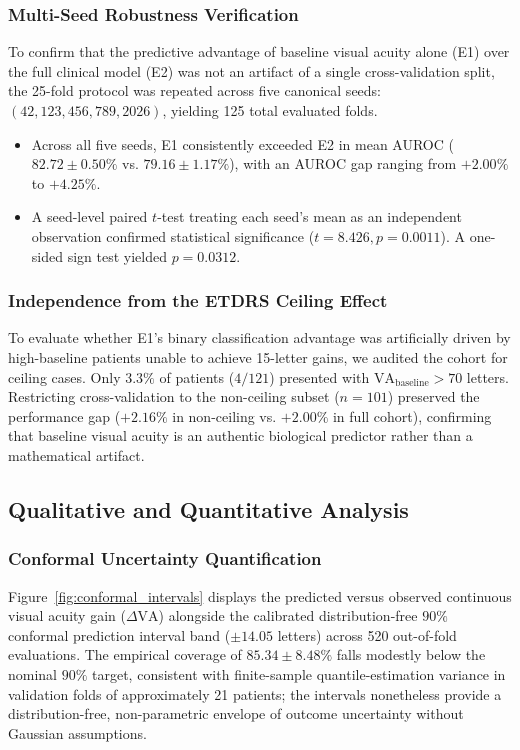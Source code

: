 \documentclass[preprint,12pt]{elsarticle}
\begin{document}
\subsubsection{Multi-Seed Robustness Verification}
To confirm that the predictive advantage of baseline visual acuity alone (E1) over the full clinical model (E2) was not an artifact of a single cross-validation split, the 25-fold protocol was repeated across five canonical seeds: $(42, 123, 456, 789, 2026)$, yielding 125 total evaluated folds. 
\begin{itemize}
    \item Across all five seeds, E1 consistently exceeded E2 in mean AUROC ($82.72 \pm 0.50\%$ vs. $79.16 \pm 1.17\%$), with an AUROC gap ranging from $+2.00\%$ to $+4.25\%$.
    \item A seed-level paired $t$-test treating each seed's mean as an independent observation confirmed statistical significance ($t = 8.426, p = 0.0011$). A one-sided sign test yielded $p = 0.0312$.
\end{itemize}

\subsubsection{Independence from the ETDRS Ceiling Effect}
To evaluate whether E1's binary classification advantage was artificially driven by high-baseline patients unable to achieve 15-letter gains, we audited the cohort for ceiling cases. Only $3.3\%$ of patients ($4/121$) presented with $\text{VA}_{\text{baseline}} > 70$ letters. Restricting cross-validation to the non-ceiling subset ($n=101$) preserved the performance gap ($+2.16\%$ in non-ceiling vs. $+2.00\%$ in full cohort), confirming that baseline visual acuity is an authentic biological predictor rather than a mathematical artifact.

\subsection{Qualitative and Quantitative Analysis}

\subsubsection{Conformal Uncertainty Quantification}
Figure~\ref{fig:conformal_intervals} displays the predicted versus observed continuous visual acuity gain ($\Delta\text{VA}$) alongside the calibrated distribution-free $90\%$ conformal prediction interval band ($\pm 14.05$ letters) across 520 out-of-fold evaluations. The empirical coverage of $85.34 \pm 8.48\%$ falls modestly below the nominal $90\%$ target, consistent with finite-sample quantile-estimation variance in validation folds of approximately 21 patients; the intervals nonetheless provide a distribution-free, non-parametric envelope of outcome uncertainty without Gaussian assumptions.
\end{document}

